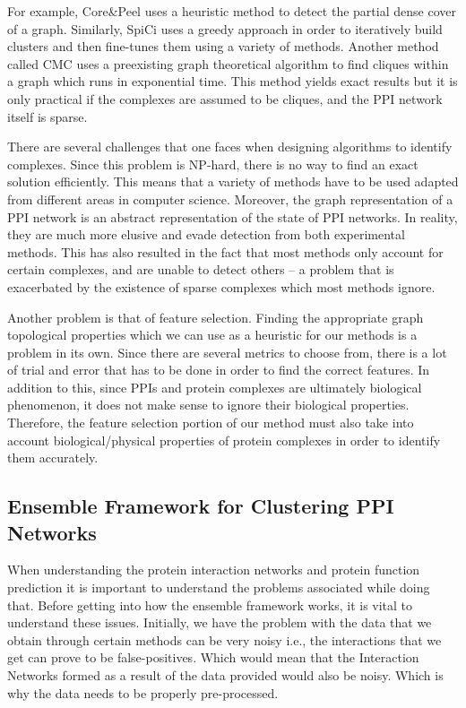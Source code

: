For example, Core\&Peel \cite{pellegrini_detecting_2012} uses a heuristic method to detect the partial dense cover of a graph.
Similarly, SpiCi \cite{jang_spici_2010} uses a greedy approach in order to iteratively build clusters and then fine-tunes 
them using a variety of methods. Another method called CMC uses a preexisting graph theoretical 
algorithm to find cliques within a graph which runs in exponential time. This method yields 
exact results but it is only practical if the complexes are assumed to be cliques, and the 
PPI network itself is sparse.

There are several challenges that one faces when designing algorithms to identify complexes.
Since this problem is NP-hard, there is no way to find an exact solution efficiently. 
This means that a variety of methods have to be used adapted from different areas in 
computer science. Moreover, the graph representation of a PPI network is an abstract 
representation of the state of PPI networks. In reality, they are much more elusive and 
evade detection from both experimental methods. This has also resulted in the fact that 
most methods only account for certain complexes, and are unable to detect others -- 
a problem that is exacerbated by the existence of sparse complexes which most 
methods ignore.

Another problem is that of feature selection. Finding the appropriate graph 
topological properties which we can use as a heuristic for our methods is a problem 
in its own. Since there are several metrics to choose from, there is a lot of 
trial and error that has to be done in order to find the correct features. In addition 
to this, since PPIs and protein complexes are ultimately biological phenomenon, it does 
not make sense to ignore their biological properties. Therefore, the feature selection 
portion of our method must also take into account biological/physical properties \cite{wu_comprehensive_2020} of 
protein complexes in order to identify them accurately.

\subsection{Ensemble Framework for Clustering PPI Networks}

When understanding the protein interaction networks and protein function prediction it is important to understand the problems associated while doing that. Before getting into how the ensemble framework works, it is vital to understand these issues. Initially, we have the problem with the data that we obtain through certain methods can be very noisy i.e., the interactions that we get can prove to be false-positives. Which would mean that the Interaction Networks formed as a result of the data provided would also be noisy. Which is why the data needs to be properly pre-processed.

